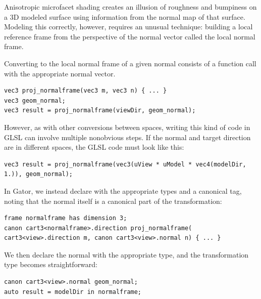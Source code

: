 \documentclass[../main.tex]{subfiles}
\begin{document}
{Anisotropic microfacet shading creates an illusion of roughness and bumpiness on a 3D modeled surface using information from the normal map of that surface.  Modeling this correctly, however, requires an unusual technique: building a local reference frame from the perspective of the normal vector called the local normal frame.

Converting to the local normal frame of a given normal consists of a function call with the appropriate normal vector.
%
\begin{lstlisting}
vec3 proj_normalframe(vec3 m, vec3 n) { ... }
vec3 geom_normal;
vec3 result = proj_normalframe(viewDir, geom_normal);
\end{lstlisting}
%
However, as with other conversions between spaces,
writing this kind of code in GLSL can
involve multiple nonobvious steps.
If the normal and target direction are in different spaces, the GLSL code must look like this:
%
\begin{lstlisting}
vec3 result = proj_normalframe(vec3(uView * uModel * vec4(modelDir, 1.)), geom_normal);
\end{lstlisting}
%
In Gator, we instead declare  with the appropriate types and a canonical tag, noting that the normal itself is a canonical part of the transformation:
%
\begin{lstlisting}
frame normalframe has dimension 3;
canon cart3<normalframe>.direction proj_normalframe(
cart3<view>.direction m, canon cart3<view>.normal n) { ... }
\end{lstlisting}
%
We then declare the normal  with the appropriate type, and the transformation type becomes straightforward:
%
\begin{lstlisting}
canon cart3<view>.normal geom_normal;
auto result = modelDir in normalframe;
\end{lstlisting}
%
}
\end{document}
